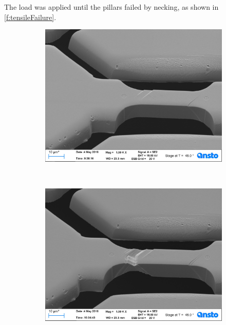 The load was applied until the pillars failed by necking, as shown in \cref{f:tensileFailure}.
\begin{figure}
    \centering
    \begin{subfigure}[t]{0.3\linewidth}
        \centering
        \includegraphics[width=\linewidth]{../data/Ni016.jpg}
    \end{subfigure}
    ~
    \begin{subfigure}[t]{0.3\linewidth}
        \centering
        \includegraphics[width=\linewidth]{../data/Ni023.jpg}
    \end{subfigure}
    ~
    \begin{subfigure}[t]{0.3\linewidth}
        \centering

\end{subfigure}
\end{figure}
